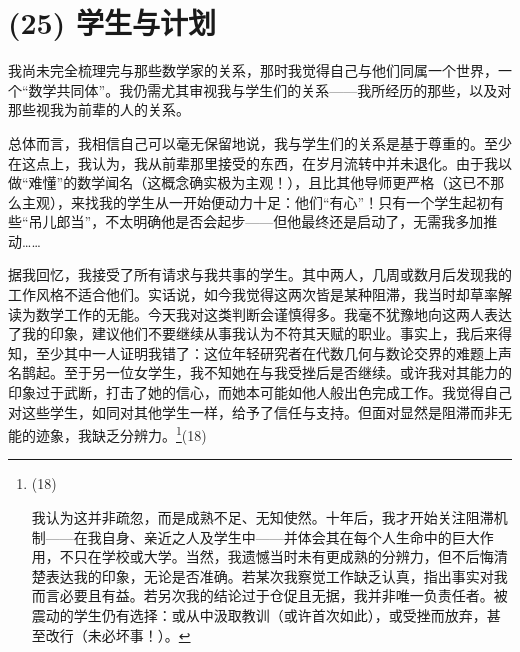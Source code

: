 \section{(25) 学生与计划}

我尚未完全梳理完与那些数学家的关系，那时我觉得自己与他们同属一个世界，一个“数学共同体”。我仍需尤其审视我与学生们的关系——我所经历的那些，以及对那些视我为前辈的人的关系。

总体而言，我相信自己可以毫无保留地说，我与学生们的关系是基于尊重的。至少在这点上，我认为，我从前辈那里接受的东西，在岁月流转中并未退化。由于我以做“难懂”的数学闻名（这概念确实极为主观！），且比其他导师更严格（这已不那么主观），来找我的学生从一开始便动力十足：他们“有心”！只有一个学生起初有些“吊儿郎当”，不太明确他是否会起步——但他最终还是启动了，无需我多加推动……

据我回忆，我接受了所有请求与我共事的学生。其中两人，几周或数月后发现我的工作风格不适合他们。实话说，如今我觉得这两次皆是某种阻滞，我当时却草率解读为数学工作的无能。今天我对这类判断会谨慎得多。我毫不犹豫地向这两人表达了我的印象，建议他们不要继续从事我认为不符其天赋的职业。事实上，我后来得知，至少其中一人证明我错了：这位年轻研究者在代数几何与数论交界的难题上声名鹊起。至于另一位女学生，我不知她在与我受挫后是否继续。或许我对其能力的印象过于武断，打击了她的信心，而她本可能如他人般出色完成工作。我觉得自己对这些学生，如同对其他学生一样，给予了信任与支持。但面对显然是阻滞而非无能的迹象，我缺乏分辨力。\footnote{(18)\par 我认为这并非疏忽，而是成熟不足、无知使然。十年后，我才开始关注阻滞机制——在我自身、亲近之人及学生中——并体会其在每个人生命中的巨大作用，不只在学校或大学。当然，我遗憾当时未有更成熟的分辨力，但不后悔清楚表达我的印象，无论是否准确。若某次我察觉工作缺乏认真，指出事实对我而言必要且有益。若另次我的结论过于仓促且无据，我并非唯一负责任者。被震动的学生仍有选择：或从中汲取教训（或许首次如此），或受挫而放弃，甚至改行（未必坏事！）。}(18)

